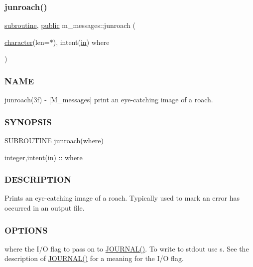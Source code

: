 \subsubsection{\texorpdfstring{junroach()}{junroach()}}
{\footnotesize\ttfamily \hyperlink{M__stopwatch_83_8txt_acfbcff50169d691ff02d4a123ed70482}{subroutine}, \hyperlink{M__stopwatch_83_8txt_a2f74811300c361e53b430611a7d1769f}{public} m\+\_\+messages\+::junroach (\begin{DoxyParamCaption}\item[{\hyperlink{option__stopwatch_83_8txt_abd4b21fbbd175834027b5224bfe97e66}{character}(len=$\ast$), intent(\hyperlink{M__journal_83_8txt_afce72651d1eed785a2132bee863b2f38}{in})}]{where }\end{DoxyParamCaption})}



\subsubsection*{N\+A\+ME}

junroach(3f) -\/ \mbox{[}M\+\_\+messages\mbox{]} print an eye-\/catching image of a roach. 

\subsubsection*{S\+Y\+N\+O\+P\+S\+IS}

\begin{DoxyVerb}SUBROUTINE junroach(where)

 integer,intent(in) :: where
\end{DoxyVerb}


\subsubsection*{D\+E\+S\+C\+R\+I\+P\+T\+I\+ON}

Prints an eye-\/catching image of a roach. Typically used to mark an error has occurred in an output file.

\subsubsection*{O\+P\+T\+I\+O\+NS}

where the I/O flag to pass on to \hyperlink{M__journal_83_8txt_aee6db01e1c6132b5b3f146b5a0c6e7e1}{J\+O\+U\+R\+N\+A\+L()}. To write to stdout use \textquotesingle{}s\textquotesingle{}. See the description of \hyperlink{M__journal_83_8txt_aee6db01e1c6132b5b3f146b5a0c6e7e1}{J\+O\+U\+R\+N\+A\+L()} for a meaning for the I/O flag.

